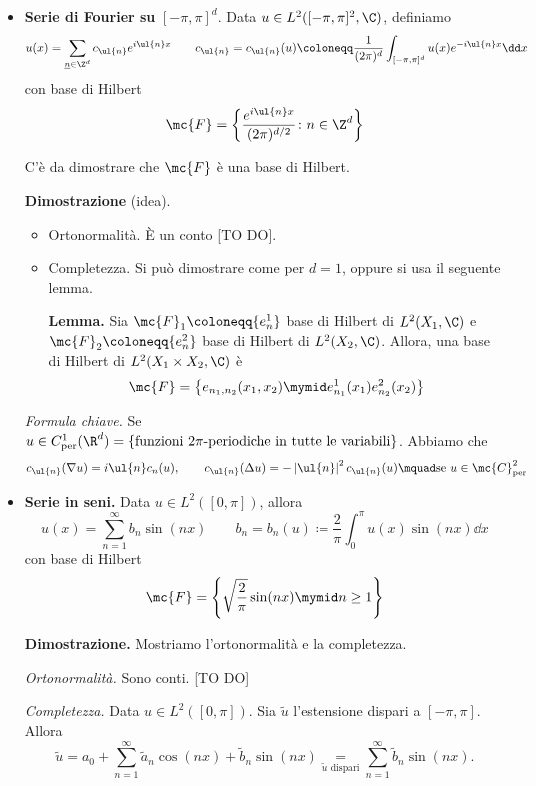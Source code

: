 \begin{itemize}

	\item \textbf{Serie di Fourier su} \boldmath$[-\pi,\pi]^d$. Data \unboldmath$u \in L^2([-\pi,\pi]^2, \C)$, definiamo
	$$
		u(x) = \sum_{\underline{n} \in \Z^d} c_{\ul{n}} e^{i \ul{n} x} \qquad 
		c_{\ul{n}} = c_{\ul{n}} (u) \coloneqq \frac{1}{(2\pi)^d} \int_{[-\pi,\pi]^d} u(x) e^{- i \ul{n} x} \dd x 
	$$
	con base di Hilbert
	$$
		\mc{F} = \left\{ \frac{e^{i \ul{n} x}}{(2\pi)^{d/2}} \colon n \in \Z^d \right\}
	$$

	C'è da dimostrare che $\mc{F}$ è una base di Hilbert.

	\textbf{Dimostrazione} (idea). 
	\begin{itemize}

		\item Ortonormalità. È un conto [TO DO].


		\item Completezza. Si può dimostrare come per $d = 1$, oppure si usa il seguente lemma.

		\textbf{Lemma.} Sia $\mc{F}_1 \coloneqq \{ e_n^1 \}$ base di Hilbert di $L^2(X_1, \C)$ e $\mc{F}_2 \coloneqq \{ e_n^2 \}$ base di Hilbert di $L^2(X_2, \C)$. Allora, una base di Hilbert di $L^2(X_1 \times X_2, \C)$ è
		$$
			\mc{F} = \left\{ e_{n_1,n_2}(x_1,x_2) \mymid e_{n_1}^1 (x_1) e_{n_2}^2(x_2) \right\}
		$$

	\end{itemize}

	\textit{Formula chiave.}
	Se $u \in C_{\text{per}}^1 (\R^d) = \left\{ \text{funzioni $2\pi$-periodiche in tutte le variabili} \right\}$. Abbiamo che
	$$
		c_{\ul{n}} (\nabla u) = i \ul{n} c_n(u), \qquad 
		c_{\ul{n}} (\Delta u) = - \left| \ul{n} \right|^2 c_{\ul{n}} (u) \mquad \text{se }  u \in \mc{C}_{\text{per}}^2
	$$


	\item \textbf{Serie in seni.} Data $u \in L^2([0,\pi])$, allora 
	$$
		u(x) = \sum_{n=1}^\infty b_n \sin(nx) \qquad 
		b_n = b_n(u) \coloneqq  \frac{2}{\pi} \int_0^\pi u(x) \sin(nx) \dd x
	$$
	con base di Hilbert 
	$$
		\mc{F} = \left\{ \sqrt{\frac{2}{\pi}} \sin(nx) \mymid n \geq 1 \right\}
	$$

	\textbf{Dimostrazione.} Mostriamo l'ortonormalità e la completezza.

	\textit{Ortonormalità.} Sono conti. [TO DO]

	\textit{Completezza.} Data $u \in L^2([0,\pi])$. Sia $\tilde{u}$ l'estensione dispari a $[-\pi,\pi]$. Allora 
	$$
		\tilde{u} = a_0 + \sum_{n=1}^{\infty} \tilde{a}_n \cos(nx) + \tilde{b}_n \sin(nx)
		\underset{\tilde{u} \text{ dispari}} = \sum_{n=1}^{\infty} \tilde{b}_n \sin(nx).
	$$


\end{itemize}
